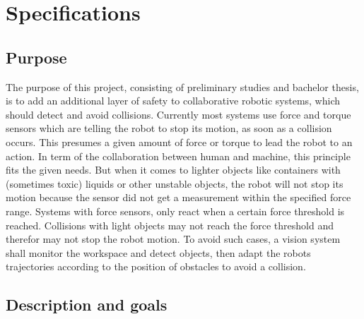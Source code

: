 \chapter{Specifications}
\label{chap:specifications}
\section{Purpose}
\label{sec:purpose}
The purpose of this project, consisting of preliminary studies and bachelor thesis, is to add an additional layer of safety to collaborative robotic systems, which should detect and avoid collisions.
Currently most systems use force and torque sensors which are telling the robot to stop its motion, as soon as a collision occurs. This presumes a given amount of force or torque to lead the robot to an action. In term of the collaboration between human and machine, this principle fits the given needs. But when it comes to lighter objects like containers with (sometimes toxic) liquids or other unstable objects, the robot will not stop its motion because the sensor did not get a measurement within the specified force range.
Systems with force sensors, only react when a certain force threshold is reached. Collisions with light objects may not reach the force threshold and therefor may not stop the robot motion. To avoid such cases, a vision system shall monitor the workspace and detect objects, then adapt the robots trajectories according to the position of obstacles to avoid a collision.

\section{Description and goals}
\label{sec:description}

